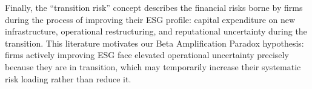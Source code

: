 Finally, the ``transition risk'' concept \citep{christophersen2022transition} describes the financial risks borne by firms during the process of improving their ESG profile: capital expenditure on new infrastructure, operational restructuring, and reputational uncertainty during the transition. This literature motivates our Beta Amplification Paradox hypothesis: firms actively improving ESG face elevated operational uncertainty precisely because they are in transition, which may temporarily increase their systematic risk loading rather than reduce it.